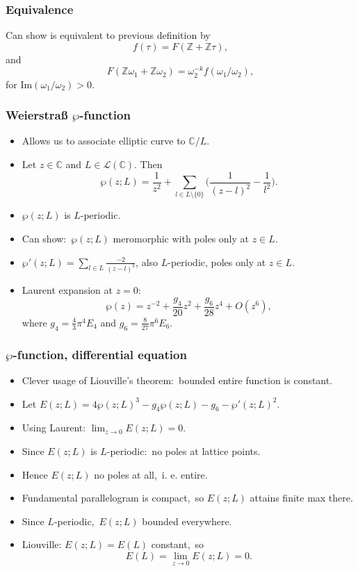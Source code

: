 \documentclass[usenames,dvipsnames]{beamer}
\theoremstyle{definition}
\begin{document}
\begin{frame}
  \frametitle{Equivalence}
  Can show is equivalent to previous definition by\pause
  \[f(\tau)=F(\mathbb{Z}+\mathbb{Z}\tau),\]\pause
  and\pause
  \[F(\mathbb{Z}\omega_1+\mathbb{Z}\omega_2)=\omega_2^{-k}f(\omega_1/\omega_2),\]
  for $\mathrm{Im}(\omega_1/\omega_2)>0$.
\end{frame}

\begin{frame}
  \frametitle{Weierstraß $\wp$-function}
  \begin{itemize}
    \item Allows us to associate elliptic curve to $\mathbb{C}/L$.\pause
    \item Let $z\in\mathbb{C}$ and $L\in\mathcal{L}(\mathbb{C})$. Then\pause
      \[\wp(z;L)=\frac{1}{z^2}+\sum_{l\in L\setminus\{0\}}\Big(\frac{1}{(z-l)^2}-\frac{1}{l^2}\Big).\]\pause
    \item $\wp(z;L)$ is $L$-periodic.\pause
    \item Can show:\pause~$\wp(z;L)$ meromorphic with poles only at $z\in L$.\pause
    \item $\wp'(z;L)=\sum_{l\in L}\frac{-2}{(z-l)^3}$, also $L$-periodic, poles only at $z\in L$.\pause
    \item Laurent expansion at $z=0$:\pause
      \[\wp(z)=z^{-2}+\frac{g_4}{20}z^2+\frac{g_6}{28}z^4+O(z^6),\]\pause
      where $g_4=\frac{4}{3}\pi^4E_4$ and $g_6=\frac{8}{27}\pi^6E_6$.
  \end{itemize}
\end{frame}

\begin{frame}
  \frametitle{$\wp$-function, differential equation}
  \begin{itemize}
    \item Clever usage of Liouville's theorem:\pause~bounded entire function is constant.\pause
    \item Let $E(z;L)=4\wp(z;L)^3-g_4\wp(z;L)-g_6-\wp'(z;L)^2$.\pause
    \item Using Laurent: $\lim_{z\to 0}E(z;L)=0$.\pause
    \item Since $E(z;L)$ is $L$-periodic:\pause~no poles at lattice points.\pause
    \item Hence $E(z;L)$ no poles at all,\pause~i. e. entire.\pause
    \item Fundamental parallelogram is compact,\pause~so $E(z;L)$ attains finite max there.\pause
    \item Since $L$-periodic,\pause~$E(z;L)$ bounded everywhere.\pause
    \item Liouville: $E(z;L)=E(L)$ constant,\pause~so
      \[E(L)=\lim_{z\to 0}E(z;L)=0.\]
  \end{itemize}
\end{frame}
\end{document}
